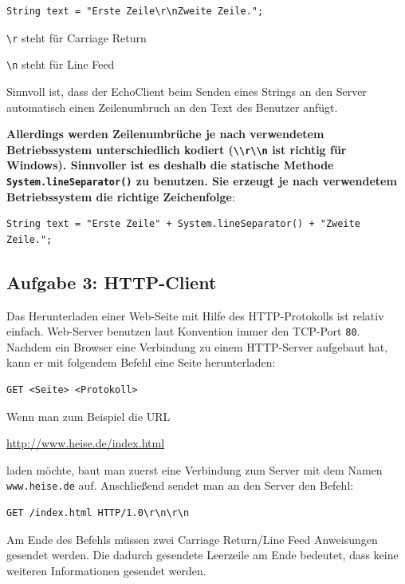 \begin{lstlisting}
String text = "Erste Zeile\r\nZweite Zeile.";
\end{lstlisting}

\lstinline|\r| steht für Carriage Return

\lstinline|\n| steht für Line Feed

Sinnvoll ist, dass der EchoClient beim Senden eines Strings an den Server
automatisch einen Zeilenumbruch an den Text des Benutzer anfügt.

\textbf{Allerdings werden Zeilenumbrüche je nach verwendetem Betriebssystem
unterschiedlich kodiert (\lstinline|\\r\\n| ist richtig für Windows).
Sinnvoller ist es deshalb die statische Methode
\lstinline|System.lineSeparator()| zu benutzen. Sie erzeugt je nach verwendetem
Betriebssystem die richtige Zeichenfolge}:

\begin{lstlisting}
String text = "Erste Zeile" + System.lineSeparator() + "Zweite Zeile.";
\end{lstlisting}


\subsection{Aufgabe 3: HTTP-Client}

Das Herunterladen einer Web-Seite mit Hilfe des HTTP-Protokolls ist relativ
einfach. Web-Server benutzen laut Konvention immer den TCP-Port \lstinline|80|.
Nachdem ein Browser eine Verbindung zu einem HTTP-Server aufgebaut hat, kann er
mit folgendem Befehl eine Seite herunterladen:

\begin{lstlisting}
GET <Seite> <Protokoll>
\end{lstlisting}

Wenn man zum Beispiel die URL 

\url{http://www.heise.de/index.html}

laden möchte, baut man zuerst eine Verbindung zum Server mit dem Namen
\lstinline|www.heise.de| auf. Anschließend sendet man an den Server den Befehl:

\begin{lstlisting}
GET /index.html HTTP/1.0\r\n\r\n
\end{lstlisting}

Am Ende des Befehls müssen zwei Carriage Return/Line Feed Anweisungen gesendet
werden. Die dadurch gesendete Leerzeile am Ende bedeutet, dass keine weiteren
Informationen gesendet werden.

